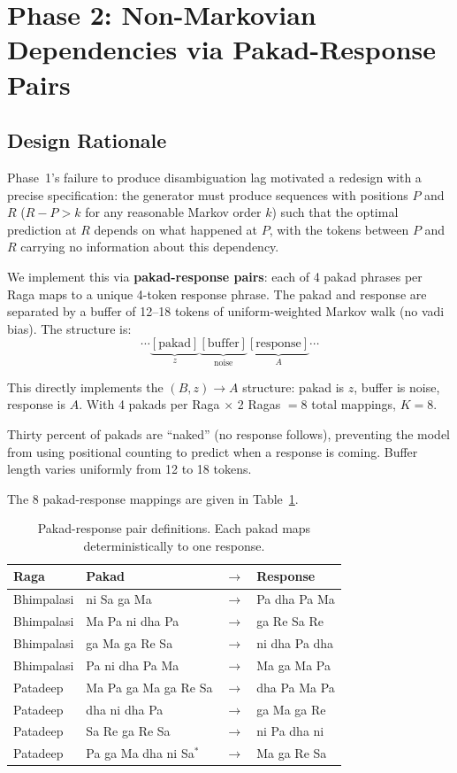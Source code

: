 \documentclass[11pt,a4paper]{article}
\begin{document}
\section{Phase 2: Non-Markovian Dependencies via Pakad-Response Pairs}

\subsection{Design Rationale}

Phase~1's failure to produce disambiguation lag motivated a redesign with a precise specification: the generator must produce sequences with positions $P$ and $R$ ($R - P > k$ for any reasonable Markov order $k$) such that the optimal prediction at $R$ depends on what happened at $P$, with the tokens between $P$ and $R$ carrying no information about this dependency.

We implement this via \textbf{pakad-response pairs}: each of 4 pakad phrases per Raga maps to a unique 4-token response phrase. The pakad and response are separated by a buffer of 12--18 tokens of uniform-weighted Markov walk (no vadi bias). The structure is:
\begin{equation*}
    \cdots \underbrace{[\text{pakad}]}_{z} \underbrace{[\text{buffer}]}_{\text{noise}} \underbrace{[\text{response}]}_{A} \cdots
\end{equation*}

This directly implements the $(B, z) \to A$ structure: pakad is $z$, buffer is noise, response is $A$. With 4 pakads per Raga $\times$ 2 Ragas $= 8$ total mappings, $K = 8$.

Thirty percent of pakads are ``naked'' (no response follows), preventing the model from using positional counting to predict when a response is coming. Buffer length varies uniformly from 12 to 18 tokens.

The 8 pakad-response mappings are given in Table~\ref{tab:pakad_response}.

\begin{table}[H]
\centering
\caption{Pakad-response pair definitions. Each pakad maps deterministically to one response.}
\label{tab:pakad_response}
\small
\begin{tabular}{llll}
\toprule
Raga & Pakad & $\to$ & Response \\
\midrule
Bhimpalasi & ni Sa ga Ma & $\to$ & Pa dha Pa Ma \\
Bhimpalasi & Ma Pa ni dha Pa & $\to$ & ga Re Sa Re \\
Bhimpalasi & ga Ma ga Re Sa & $\to$ & ni dha Pa dha \\
Bhimpalasi & Pa ni dha Pa Ma & $\to$ & Ma ga Ma Pa \\
\midrule
Patadeep & Ma Pa ga Ma ga Re Sa & $\to$ & dha Pa Ma Pa \\
Patadeep & dha ni dha Pa & $\to$ & ga Ma ga Re \\
Patadeep & Sa Re ga Re Sa & $\to$ & ni Pa dha ni \\
Patadeep & Pa ga Ma dha ni Sa$^*$ & $\to$ & Ma ga Re Sa \\
\bottomrule
\end{tabular}
\end{table}
\end{document}
